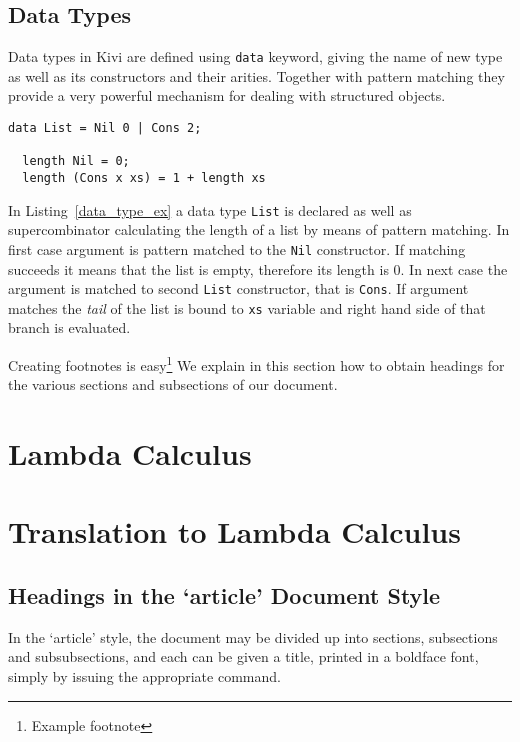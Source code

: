 \documentclass[a4paper]{report}
\begin{document}
\subsection{Data Types}
Data types in Kivi are defined using \texttt{data} keyword, giving the name of
new type as well as its constructors and their arities. Together with pattern matching they
provide a very powerful mechanism for dealing with structured objects.

\begin{lstlisting}[label=data_type_ex,caption={Calculating length of list.}]
  data List = Nil 0 | Cons 2;

  length Nil = 0;
  length (Cons x xs) = 1 + length xs
\end{lstlisting}

In Listing~\ref{data_type_ex} a data type \texttt{List} is declared as well as
supercombinator calculating the length of a list by means of pattern matching.
In first case argument is pattern matched to the \texttt{Nil} constructor. If
matching succeeds it means that the list is empty, therefore its length is 0.
In next case the argument is matched to second \texttt{List} constructor, that
is \texttt{Cons}. If argument matches the \textit{tail} of the list is bound to
\texttt{xs} variable and right hand side of that branch is evaluated.

Creating footnotes is easy\footnote{Example footnote}
We explain in this section how to obtain headings
for the various sections and subsections of our
document.

\section{Lambda Calculus}

\section{Translation to Lambda Calculus}



\subsection{Headings in the `article' Document Style}

In the `article' style, the document may be divided up
into sections, subsections and subsubsections, and each
can be given a title, printed in a boldface font, simply by issuing the
appropriate command.



\end{document}
